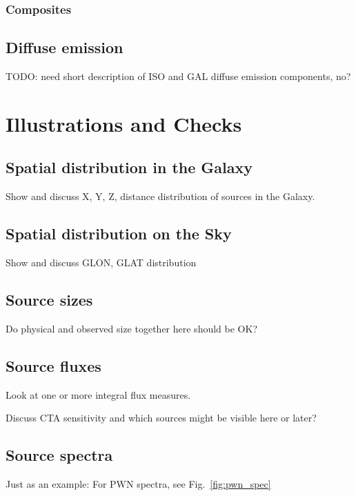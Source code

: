 \documentclass{article}
\begin{document}
\subsubsection{Composites}

\subsection{Diffuse emission}

TODO: need short description of ISO and GAL diffuse emission components, no?

\section{Illustrations and Checks}

\subsection{Spatial distribution in the Galaxy}

Show and discuss X, Y, Z, distance distribution of sources in the Galaxy.

\subsection{Spatial distribution on the Sky}

Show and discuss GLON, GLAT distribution

\subsection{Source sizes}

Do physical and observed size together here should be OK?

\subsection{Source fluxes}

Look at one or more integral flux measures.

Discuss CTA sensitivity and which sources might be visible here or later?

\subsection{Source spectra}

Just as an example: For PWN spectra, see Fig.~\ref{fig:pwn_spec}
\end{document}
